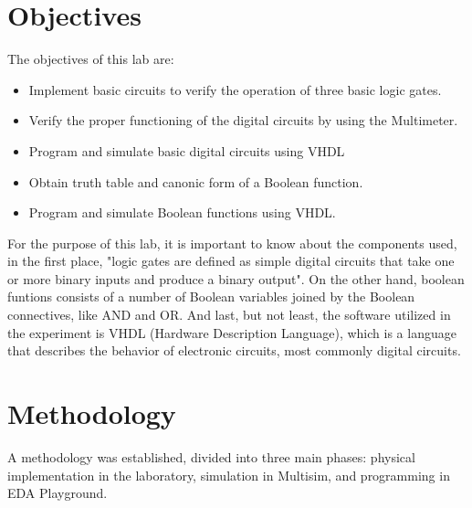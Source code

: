 \documentclass[12pt]{article}  %
\begin{document}
\section{Objectives} %
The objectives of this lab are:
\begin{itemize}
  \item Implement basic circuits to verify the operation of three basic logic gates.
  \item Verify the proper functioning of the digital circuits by using the Multimeter.
  \item Program and simulate basic digital circuits using VHDL
  \item Obtain truth table and canonic form of a Boolean function.
  \item Program and simulate Boolean functions using VHDL.
\end{itemize}
For the purpose of this lab, it is important to know about the components used, in the first place, "logic gates are defined as simple digital circuits that take one or more binary inputs and produce a binary output"\cite{HARRIS20221}.
On the other hand, boolean funtions consists of a number of Boolean variables joined by the Boolean connectives, like AND and OR. \cite{HOLDSWORTH200228}
And last, but not least, the software utilized in the experiment is VHDL (Hardware Description Language), which is a language that describes the behavior of electronic circuits, most commonly digital circuits. \cite{IntelVHDLDef}
\section{Methodology}
A methodology was established, divided into three main phases: physical
implementation in the laboratory, simulation in Multisim, and programming in
EDA Playground.
\end{document}
